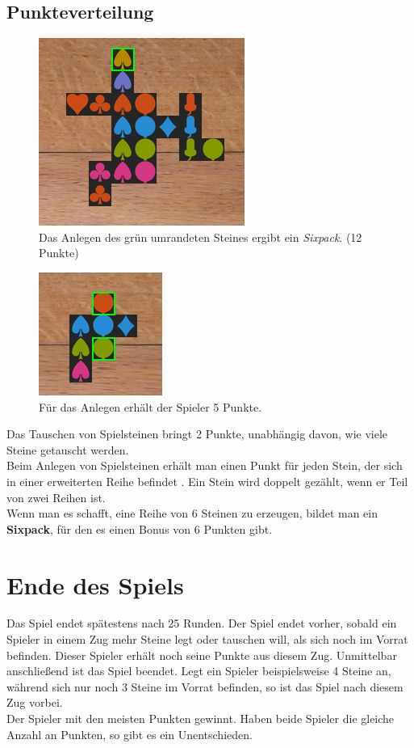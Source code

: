 \documentclass[a4paper, ngerman]{scrartcl}
\begin{document}
\subsection{Punkteverteilung}
\begin{figure}[h]
\centering
	\includegraphics[scale = 0.6]{images/sixpack_legen}
		\caption{Das Anlegen des grün umrandeten Steines ergibt ein \emph{Sixpack}. (12 Punkte)}
		\label{fig:PunkteSixpack}	
\end{figure}
\begin{figure}
	\centering	
		\includegraphics[scale = 0.7]{images/anlegen04}
		\caption{Für das Anlegen erhält der Spieler 5 Punkte.}
		\label{fig:Punkte1}	
\end{figure}
Das Tauschen von Spielsteinen bringt 2 Punkte, unabhängig davon, wie viele Steine getauscht werden.\\
Beim Anlegen von Spielsteinen erhält man einen Punkt für jeden Stein, der sich in einer erweiterten Reihe befindet . Ein Stein wird doppelt gezählt, wenn er Teil von zwei Reihen ist.\\
Wenn man es schafft, eine Reihe von 6 Steinen zu erzeugen, bildet man ein \textbf{Sixpack}, für den es einen Bonus von 6 Punkten gibt.
\newpage
	
\section{Ende des Spiels}
\label{sec:gameOver}
Das Spiel endet spätestens nach 25 Runden. Der Spiel endet vorher, sobald ein Spieler in einem Zug mehr Steine legt oder tauschen will, als sich noch im Vorrat befinden. Dieser Spieler erhält noch seine Punkte aus diesem Zug. Unmittelbar anschließend ist das Spiel beendet. Legt ein Spieler beispielsweise 4 Steine an, während sich nur noch 3 Steine im Vorrat befinden, so ist das Spiel nach diesem Zug vorbei.\\
Der Spieler mit den meisten Punkten gewinnt. Haben beide Spieler die gleiche Anzahl an Punkten, so gibt es ein Unentschieden.
\end{document}
